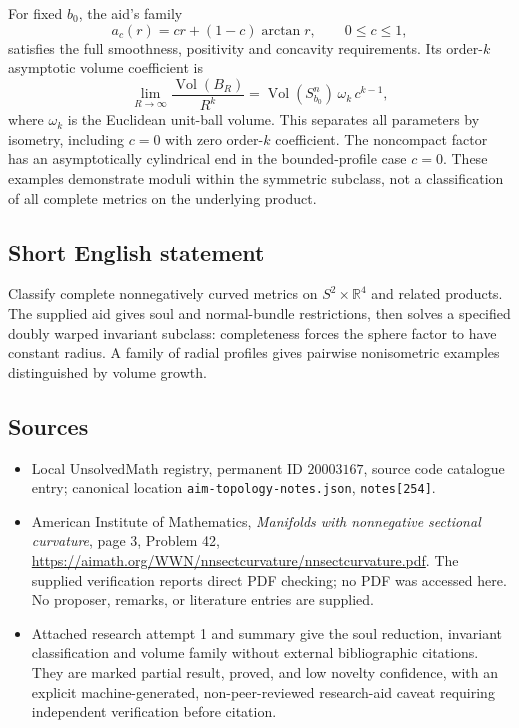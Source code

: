 \documentclass[11pt]{article}
\newcommand{\R}{\mathbb{R}}
\begin{document}
For fixed $b_0$, the aid's family
\[
 a_c(r)=cr+(1-c)\arctan r,\qquad 0\leq c\leq1,
\]
satisfies the full smoothness, positivity and concavity requirements. Its order-$k$ asymptotic volume coefficient is
\[
 \lim_{R\to\infty}\frac{\operatorname{Vol}(B_R)}{R^k}
   =\operatorname{Vol}(S^n_{b_0})\,\omega_k\,c^{k-1},
\]
where $\omega_k$ is the Euclidean unit-ball volume. This separates all parameters by isometry, including $c=0$ with zero order-$k$ coefficient. The noncompact factor has an asymptotically cylindrical end in the bounded-profile case $c=0$. These examples demonstrate moduli within the symmetric subclass, not a classification of all complete metrics on the underlying product.
\subsection{Short English statement}
Classify complete nonnegatively curved metrics on $S^2\times\R^4$ and related products. The supplied aid gives soul and normal-bundle restrictions, then solves a specified doubly warped invariant subclass: completeness forces the sphere factor to have constant radius. A family of radial profiles gives pairwise nonisometric examples distinguished by volume growth.
\subsection{Sources}
\begin{itemize}
\item Local UnsolvedMath registry, permanent ID $20003167$, source code catalogue entry; canonical location \texttt{aim-topology-notes.json}, \texttt{notes[254]}.
\item American Institute of Mathematics, \emph{Manifolds with nonnegative sectional curvature}, page 3, Problem 42, \url{https://aimath.org/WWN/nnsectcurvature/nnsectcurvature.pdf}. The supplied verification reports direct PDF checking; no PDF was accessed here. No proposer, remarks, or literature entries are supplied.
\item Attached research attempt 1 and summary give the soul reduction, invariant classification and volume family without external bibliographic citations. They are marked partial result, proved, and low novelty confidence, with an explicit machine-generated, non-peer-reviewed research-aid caveat requiring independent verification before citation.
\end{itemize}
\end{document}

